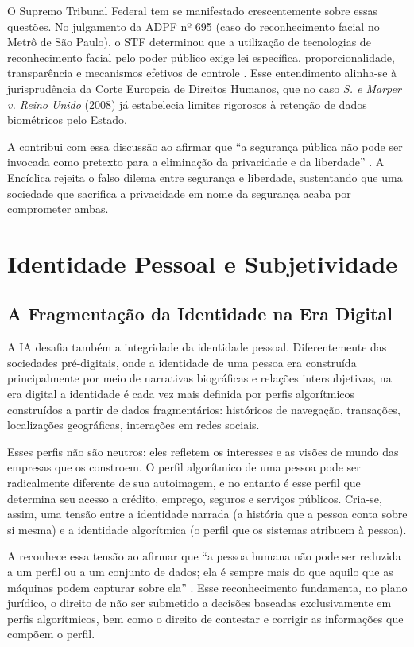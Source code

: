 O Supremo Tribunal Federal tem se manifestado crescentemente sobre essas questões. No julgamento da ADPF nº 695 (caso do reconhecimento facial no Metrô de São Paulo), o STF determinou que a utilização de tecnologias de reconhecimento facial pelo poder público exige lei específica, proporcionalidade, transparência e mecanismos efetivos de controle \cite{STF2022ADPF695}. Esse entendimento alinha-se à jurisprudência da Corte Europeia de Direitos Humanos, que no caso \textit{S. e Marper v. Reino Unido} (2008) já estabelecia limites rigorosos à retenção de dados biométricos pelo Estado.

A \MH{} contribui com essa discussão ao afirmar que ``a segurança pública não pode ser invocada como pretexto para a eliminação da privacidade e da liberdade'' \cite{LeaoXIV2026MH}. A Encíclica rejeita o falso dilema entre segurança e liberdade, sustentando que uma sociedade que sacrifica a privacidade em nome da segurança acaba por comprometer ambas.

\section{Identidade Pessoal e Subjetividade}
\label{sec:identidade}

\subsection{A Fragmentação da Identidade na Era Digital}
\label{subsec:fragmentacao-identidade}

A IA desafia também a integridade da identidade pessoal. Diferentemente das sociedades pré-digitais, onde a identidade de uma pessoa era construída principalmente por meio de narrativas biográficas e relações intersubjetivas, na era digital a identidade é cada vez mais definida por perfis algorítmicos construídos a partir de dados fragmentários: históricos de navegação, transações, localizações geográficas, interações em redes sociais.

Esses perfis não são neutros: eles refletem os interesses e as visões de mundo das empresas que os constroem. O perfil algorítmico de uma pessoa pode ser radicalmente diferente de sua autoimagem, e no entanto é esse perfil que determina seu acesso a crédito, emprego, seguros e serviços públicos. Cria-se, assim, uma tensão entre a identidade narrada (a história que a pessoa conta sobre si mesma) e a identidade algorítmica (o perfil que os sistemas atribuem à pessoa).

A \MH{} reconhece essa tensão ao afirmar que ``a pessoa humana não pode ser reduzida a um perfil ou a um conjunto de dados; ela é sempre mais do que aquilo que as máquinas podem capturar sobre ela'' \cite{LeaoXIV2026MH}. Esse reconhecimento fundamenta, no plano jurídico, o direito de não ser submetido a decisões baseadas exclusivamente em perfis algorítmicos, bem como o direito de contestar e corrigir as informações que compõem o perfil.

